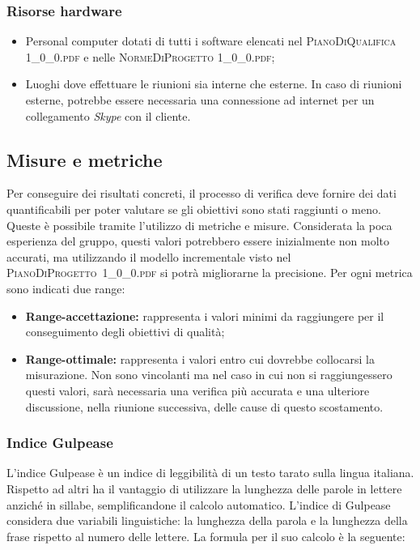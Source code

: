 		\subsubsection{Risorse hardware}
		\begin{itemize}
			\item Personal computer dotati di tutti i software elencati nel \textsc{PianoDiQualifica 1\_0\_0.pdf} e nelle \textsc{NormeDiProgetto 1\_0\_0.pdf};
			\item Luoghi dove effettuare le riunioni sia interne che esterne. In caso di riunioni esterne, potrebbe essere necessaria una connessione ad internet per un collegamento \textit{Skype} con il cliente.
		\end{itemize}
		
						
	\subsection{Misure e metriche}
		Per conseguire dei risultati concreti, il processo di verifica deve fornire dei dati quantificabili per poter valutare se gli obiettivi sono stati raggiunti o meno. Queste è possibile tramite l’utilizzo di metriche e misure. Considerata la poca esperienza del gruppo, questi valori potrebbero essere inizialmente non molto accurati, ma utilizzando il modello incrementale visto nel \hbox{\textsc{PianoDiProgetto 1\_0\_0.pdf}} si potrà migliorarne la precisione.
		Per ogni metrica sono indicati due range:
		\begin{itemize}
			\item \textbf{Range-accettazione: }rappresenta i valori minimi da raggiungere per il conseguimento degli obiettivi di qualità;
			\item \textbf{Range-ottimale: }rappresenta i valori entro cui dovrebbe collocarsi la misurazione. Non sono vincolanti ma nel caso in cui non si raggiungessero questi valori, sarà necessaria una verifica più accurata e una ulteriore discussione, nella riunione successiva, delle cause di questo scostamento.
		\end{itemize}
		
		\subsubsection{Indice Gulpease}
		L'indice Gulpease è un indice di leggibilità di un testo tarato sulla lingua italiana. Rispetto ad altri ha il vantaggio di utilizzare la lunghezza delle parole in lettere anziché in sillabe, semplificandone il calcolo automatico.
		L'indice di Gulpease considera due variabili linguistiche: la lunghezza della parola e la lunghezza della frase rispetto al numero delle lettere.
		La formula per il suo calcolo è la seguente:
		
